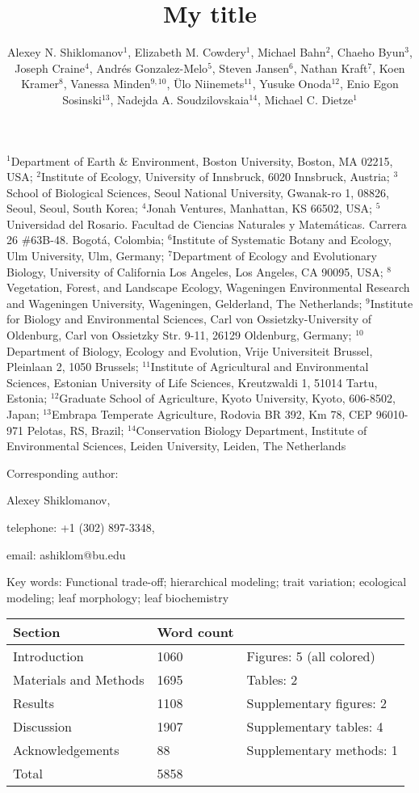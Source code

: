 \documentclass{article}
\title{My title}
\author{Alexey N. Shiklomanov\(^1\), Elizabeth M. Cowdery\(^1\), Michael
  Bahn\(^2\), Chaeho Byun\(^3\), Joseph Craine\(^4\), Andrés
  Gonzalez-Melo\(^5\), Steven Jansen\(^6\), Nathan Kraft\(^7\), Koen
  Kramer\(^{8}\), Vanessa Minden\(^{9,10}\), Ülo Niinemets\(^{11}\),
  Yusuke Onoda\(^{12}\), Enio Egon Sosinski\(^{13}\), Nadejda A.
  Soudzilovskaia\(^{14}\), Michael C. Dietze\(^1\)}
\begin{document}
\(^1\)Department of Earth \& Environment, Boston University, Boston, MA
02215, USA;
\(^2\)Institute of Ecology, University of Innsbruck, 6020
Innsbruck, Austria;
\(^3\)School of Biological Sciences, Seoul National
University, Gwanak-ro 1, 08826, Seoul, Seoul, South Korea;
\(^4\)Jonah
Ventures, Manhattan, KS 66502, USA;
\(^5\)Universidad del Rosario.
Facultad de Ciencias Naturales y Matemáticas. Carrera 26 \#63B-48.
Bogotá, Colombia;
\(^6\)Institute of Systematic Botany and Ecology, Ulm
University, Ulm, Germany;
\(^7\)Department of Ecology and Evolutionary
Biology, University of California Los Angeles, Los Angeles, CA 90095,
USA;
\(^{8}\)Vegetation, Forest, and Landscape Ecology, Wageningen
Environmental Research and Wageningen University, Wageningen,
Gelderland, The Netherlands;
\(^{9}\)Institute for Biology and
Environmental Sciences, Carl von Ossietzky-University of Oldenburg, Carl
von Ossietzky Str. 9-11, 26129 Oldenburg, Germany;
\(^{10}\)Department
of Biology, Ecology and Evolution, Vrije Universiteit Brussel, Pleinlaan
2, 1050 Brussels;
\(^{11}\)Institute of Agricultural and Environmental
Sciences, Estonian University of Life Sciences, Kreutzwaldi 1, 51014
Tartu, Estonia;
\(^{12}\)Graduate School of Agriculture, Kyoto
University, Kyoto, 606-8502, Japan;
\(^{13}\)Embrapa Temperate
Agriculture, Rodovia BR 392, Km 78, CEP 96010-971 Pelotas, RS, Brazil;
\(^{14}\)Conservation Biology Department, Institute of Environmental
Sciences, Leiden University, Leiden, The Netherlands

Corresponding author:

Alexey Shiklomanov,

telephone: +1 (302) 897-3348,

email: ashiklom@bu.edu

Key words: Functional trade-off; hierarchical modeling; trait variation;
ecological modeling; leaf morphology; leaf biochemistry

\begin{longtable}[]{@{}lll@{}}
\toprule
Section & Word count &\tabularnewline
\midrule
\endhead
Introduction & 1060 & Figures: 5 (all colored)\tabularnewline
Materials and Methods & 1695 & Tables: 2\tabularnewline
Results & 1108 & Supplementary figures: 2\tabularnewline
Discussion & 1907 & Supplementary tables: 4\tabularnewline
Acknowledgements & 88 & Supplementary methods: 1\tabularnewline
Total & 5858 &\tabularnewline
\bottomrule
\end{longtable}


\end{document}
